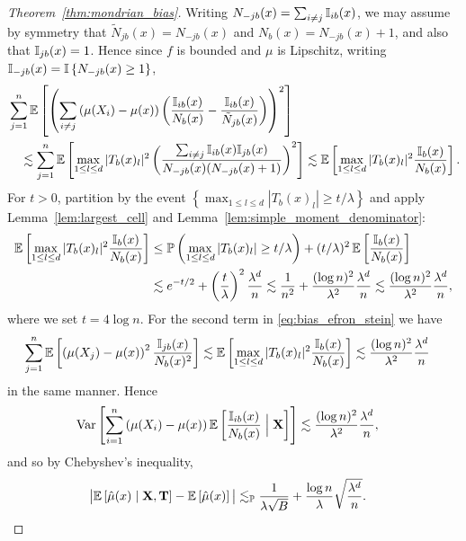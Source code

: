 \begin{proof}[Theorem~\ref{thm:mondrian_bias}]
  Writing $N_{-j b}(x) = \sum_{i \neq j} \mathbb{I}_{i b}(x)$,
  we may assume by symmetry that
  $\tilde N_{j b}(x) = N_{-j b}(x)$ and $N_b(x) = N_{-j b}(x) + 1$,
  and also that $\mathbb{I}_{j b}(x) = 1$.
  Hence since $f$ is bounded and $\mu$ is Lipschitz,
  writing $\mathbb{I}_{-j b}(x) = \mathbb{I} \left\{ N_{-j b}(x) \geq 1 \right\}$,
  \begin{align*}
    &\sum_{j=1}^{n}
    \mathbb{E} \left[
      \left(
        \sum_{i \neq j}
        \left( \mu(X_i) - \mu(x) \right)
        \left(
          \frac{\mathbb{I}_{i b}(x)}{N_b(x)} - \frac{\mathbb{I}_{i b}(x)}{\tilde N_{j b}(x)}
        \right)
      \right)^2
    \right] \\
    &\quad\lesssim
    \sum_{j=1}^{n}
    \mathbb{E} \left[
      \max_{1 \leq l \leq d}
      |T_b(x)_l|^2
      \left(
        \frac{\sum_{i \neq j}\mathbb{I}_{i b}(x) \mathbb{I}_{j b}(x)}
        {N_{-j b}(x)(N_{-j b}(x) + 1)}
      \right)^2
    \right]
    \lesssim
    \mathbb{E} \left[
      \max_{1 \leq l \leq d}
      |T_b(x)_l|^2
      \frac{\mathbb{I}_{b}(x)}{N_{b}(x)}
    \right].
  \end{align*}
  For $t > 0$, partition by the event
  $\left\{ \max_{1 \leq l \leq d} |T_b(x)_l| \geq t/\lambda \right\}$
  and apply Lemma~\ref{lem:largest_cell} and
  Lemma~\ref{lem:simple_moment_denominator}:
  \begin{align*}
    \mathbb{E} \left[
      \max_{1 \leq l \leq d}
      |T_b(x)_l|^2
      \frac{\mathbb{I}_{b}(x)}{N_{b}(x)}
    \right]
    &\leq
    \mathbb{P} \left(
      \max_{1 \leq l \leq d} |T_b(x)_l| \geq t/\lambda
    \right)
    + (t / \lambda)^2\,
    \mathbb{E} \left[
      \frac{\mathbb{I}_{b}(x)}{N_{b}(x)}
    \right] \\
    &\lesssim
    e^{-t/2}
    + \left( \frac{t}{\lambda} \right)^2
    \frac{\lambda^d}{n}
    \lesssim
    \frac{1}{n^2}
    + \frac{(\log n)^2}{\lambda^2}
    \frac{\lambda^d}{n}
    \lesssim
    \frac{(\log n)^2}{\lambda^2}
    \frac{\lambda^{d}}{n},
  \end{align*}
  where we set $t = 4 \log n$.
  For the second term in \eqref{eq:bias_efron_stein} we have
  \begin{align*}
    \sum_{j=1}^{n}
    \mathbb{E} \left[
      \left( \mu(X_j) - \mu(x) \right)^2
      \frac{\mathbb{I}_{j b}(x)}{N_b(x)^2}
    \right]
    &\lesssim
    \mathbb{E} \left[
      \max_{1 \leq l \leq d}
      |T_b(x)_l|^{2}
      \frac{\mathbb{I}_{b}(x)}{N_b(x)}
    \right]
    \lesssim
    \frac{(\log n)^2}{\lambda^2}
    \frac{\lambda^{d}}{n}
  \end{align*}
  in the same manner.
  Hence
  \begin{align*}
    \operatorname{Var} \left[
      \sum_{i=1}^{n}
      \left( \mu(X_i) - \mu(x) \right)
      \mathbb{E} \left[
        \frac{\mathbb{I}_{i b}(x)}{N_b(x)}
        \Bigm| \mathbf{X}
      \right]
    \right]
    &\lesssim
    \frac{(\log n)^2}{\lambda^2}
    \frac{\lambda^{d}}{n},
  \end{align*}
  and so by Chebyshev's inequality,
  \begin{align*}
    \big|
    \mathbb{E} \left[ \hat \mu(x) \mid \mathbf{X}, \mathbf{T} \right]
    - \mathbb{E} \left[ \hat \mu(x) \right]
    \big|
    &\lesssim_{\mathbb{P}}
    \frac{1}{\lambda \sqrt B}
    + \frac{\log n}{\lambda}
    \sqrt{ \frac{\lambda^{d}}{n} }.
  \end{align*}


\end{proof}
